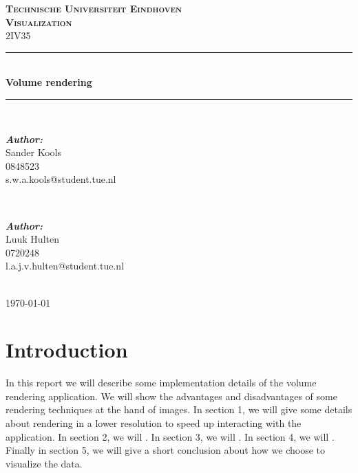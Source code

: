 \documentclass[a4paper,twoside,11pt]{article}
\newcommand{\HRule}{\rule{\linewidth}{0.5mm}} %
\begin{document}
\begin{titlepage}

\center %

\textsc{\Huge \textbf{Technische Universiteit Eindhoven}}\\[1.5cm] %
\textsc{\LARGE \textbf{Visualization}}\\[0.5cm] %
\textsc{\large 2IV35}\\[0.5cm] %

\HRule \\[0.4cm]
{ \huge \bfseries Volume rendering}\\[0.4cm] %
\HRule \\[1.5cm]

\begin{minipage}{0.4\textwidth}
\begin{flushleft} \large
\emph{\textbf{Author:}}\\
Sander Kools \\
0848523 \\
s.w.a.kools@student.tue.nl %
\end{flushleft}
\end{minipage}
~
\begin{minipage}{0.4\textwidth}
\begin{flushright} \large
\emph{\textbf{Author:}}\\
Luuk Hulten\\
0720248 \\
l.a.j.v.hulten@student.tue.nl
\end{flushright}
\end{minipage}\\[4cm]

{\large \today}\\[3cm] %

\vfill %

\end{titlepage}

\newpage
\tableofcontents
\newpage

\section*{Introduction}
In this report we will describe some implementation details of the volume rendering application. We will show the advantages and disadvantages of some rendering techniques at the hand of images.
In section 1, we will give some details about rendering in a lower resolution to speed up interacting with the application. \newline
In section 2, we will . \newline
In section 3, we will . \newline
In section 4, we will . \newline
Finally in section 5, we will give a short conclusion about how we choose to visualize the data. \newline
\end{document}
